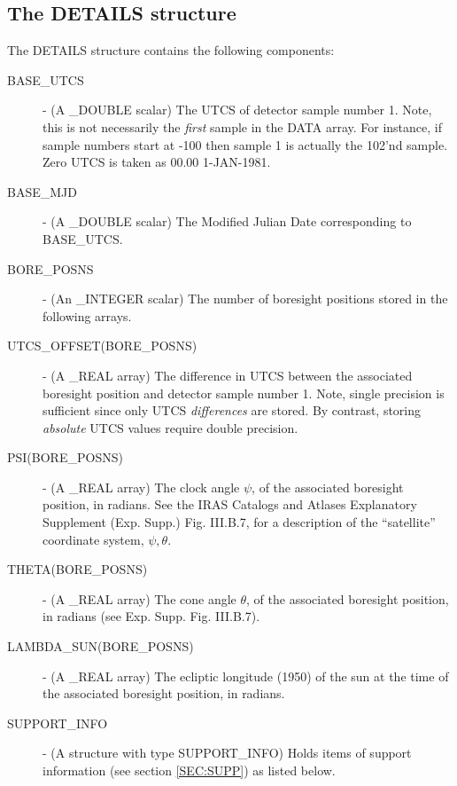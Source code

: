 \subsection{ The DETAILS structure}
The DETAILS structure contains the following components:
\begin {description}

\item [BASE\_UTCS] - (A \_DOUBLE scalar) The UTCS of detector sample number 1.
Note, this is not necessarily the {\em first} sample in the DATA array. For
instance, if sample numbers start at -100 then sample 1 is actually the 102'nd
sample. Zero UTCS is taken as 00.00 1-JAN-1981.

\item [BASE\_MJD] - (A \_DOUBLE scalar) The Modified Julian Date
corresponding to BASE\_UTCS.

\item [BORE\_POSNS] - (An \_INTEGER scalar) The number of boresight positions
stored in the following arrays.

\item [UTCS\_OFFSET(BORE\_POSNS)] -  (A \_REAL array) The difference in UTCS
between the associated boresight position and detector sample number 1. Note,
single precision is sufficient since only UTCS {\em differences} are stored.
By contrast, storing {\em absolute} UTCS values require double precision.

\item [PSI(BORE\_POSNS)] -  (A \_REAL array) The clock angle $\psi$, of the
associated boresight position, in radians. See the IRAS Catalogs and Atlases
Explanatory Supplement (Exp. Supp.) Fig. III.B.7,  for a description of the
``satellite'' coordinate system, ${\psi,\theta}$.

\item [THETA(BORE\_POSNS)] -  (A \_REAL array) The cone angle $\theta$, of the
associated boresight position, in radians (see Exp. Supp. Fig. III.B.7).

\item [LAMBDA\_SUN(BORE\_POSNS)] -  (A \_REAL array) The ecliptic longitude
(1950) of the sun at the time of the associated boresight position, in radians.

\item [SUPPORT\_INFO] - (A structure with type SUPPORT\_INFO) Holds items of
support information (see section \ref {SEC:SUPP}) as listed below.

\end{description}

